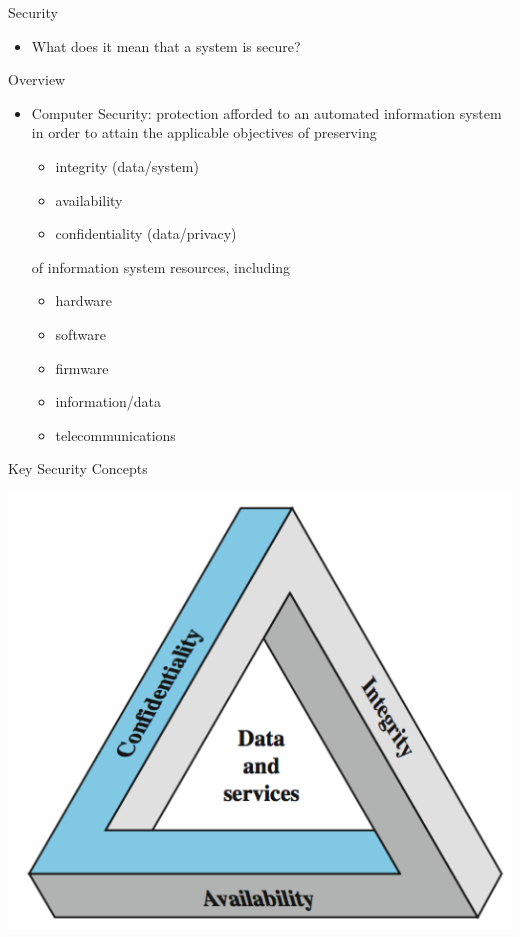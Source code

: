 \documentclass{beamer}
\begin{document}

\begin{frame}{Security}
  \begin{itemize}
  \item What does it mean that a system is secure?
  \end{itemize}
\end{frame}

\begin{frame}{Overview}
  \begin{itemize}
  \item \alert{Computer Security}: protection afforded to an 
    automated information system in order to attain 
    the applicable objectives of preserving
    
    \begin{itemize}
    \item integrity (data/system)
    \item availability
    \item confidentiality (data/privacy)
    \end{itemize}
of  information system resources, including
 
\begin{itemize}
  \item hardware
  \item software
  \item firmware
  \item information/data
  \item telecommunications
\end{itemize}
  \end{itemize}
\end{frame}


\begin{frame}{Key Security Concepts}
  \begin{center}
    \includegraphics[width=0.7\linewidth]{concepts}
  \end{center}
\end{frame}
\end{document}
